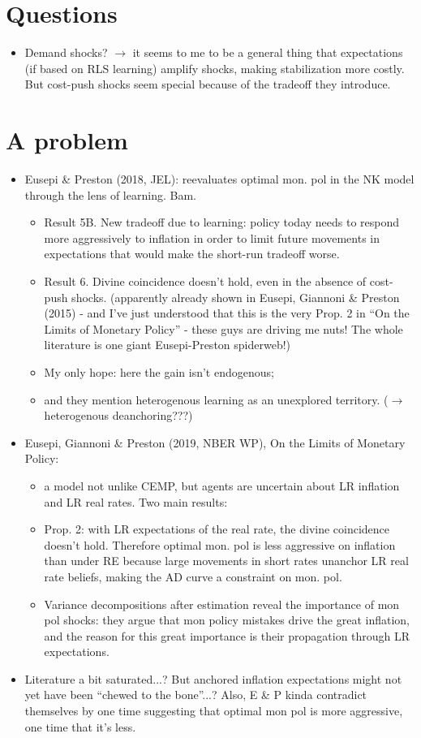 \documentclass[11pt]{article}
\renewcommand{\[}{\begin{equation}}
\renewcommand{\]}{\end{equation}}
\begin{document}
\section{Questions}
\begin{itemize}
\item Demand shocks? $\rightarrow$ it seems to me to be a general thing that expectations (if based on RLS learning) amplify shocks, making stabilization more costly. But cost-push shocks seem special because of the tradeoff they introduce. 
\end{itemize}


\section{A problem}
\begin{itemize}
\item Eusepi \& Preston (2018, JEL): reevaluates optimal mon. pol in the NK model through the lens of learning. Bam. 
\begin{itemize}
\item Result 5B. New tradeoff due to learning: policy today needs to respond more aggressively to inflation in order to limit future movements in expectations that would make the short-run tradeoff worse. 
\item Result 6. Divine coincidence doesn't hold, even in the absence of cost-push shocks. (apparently already shown in Eusepi, Giannoni \& Preston (2015) - and I've just understood that this is the very Prop. 2 in ``On the Limits of Monetary Policy'' - these guys are driving me nuts! The whole literature is one giant Eusepi-Preston spiderweb!)
\item My only hope:  here the gain isn't endogenous;
\item and they mention heterogenous learning as an unexplored territory. ($\rightarrow$ heterogenous deanchoring???)
\end{itemize}
\item Eusepi, Giannoni \& Preston (2019, NBER WP), On the Limits of Monetary Policy:
\begin{itemize}
\item a model not unlike CEMP, but agents are uncertain about LR inflation and LR real rates. Two main results:
\item Prop. 2: with LR expectations of the real rate, the divine coincidence doesn't hold. Therefore optimal mon. pol is less aggressive on inflation than under RE because large movements in short rates unanchor LR real rate beliefs, making the AD curve a constraint on mon. pol. 
\item Variance decompositions after estimation reveal the importance of mon pol shocks: they argue that mon policy mistakes drive the great inflation, and the reason for this great importance is their propagation through LR expectations. 
\end{itemize}
\item Literature a bit saturated...? But anchored inflation expectations might not yet have been ``chewed to the bone''...? Also, E \& P kinda contradict themselves by one time suggesting that optimal mon pol is more aggressive, one time that it's less. 
\end{itemize}
\end{document}

